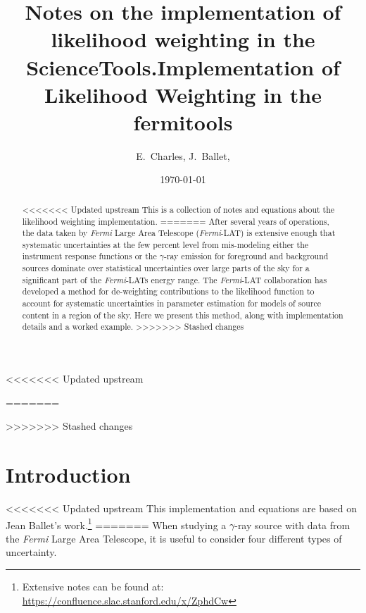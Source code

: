 \documentclass[preprint]{aastex}
\begin{document}
%
<<<<<<< Updated upstream
\title{Notes on the implementation of likelihood weighting in the ScienceTools.}  
=======
\title{Implementation of Likelihood Weighting in the fermitools}
>>>>>>> Stashed changes

\author{ 
E.~Charles, 
J.~Ballet, 
}

\date{\today}

\begin{abstract}
<<<<<<< Updated upstream
  This is a collection of notes and equations about the likelihood weighting implementation.
=======
  After several years of operations, the data taken by {\it Fermi} Large Area Telescope ({\it Fermi}-LAT) is extensive
  enough that systematic uncertainties at the few percent level from mis-modeling either the instrument response functions
  or the $\gamma$-ray emission for foreground and background sources dominate over statistical uncertainties
  over large parts of the sky for a significant part of the {\it Fermi}-LATs energy range.   The {\it Fermi}-LAT
  collaboration has developed a method for de-weighting contributions to the likelihood function 
  to account for systematic uncertainties in parameter estimation for models of source content in
  a region of the sky.
  Here we present this method, along with implementation details and a worked example.
>>>>>>> Stashed changes
\end{abstract}

\maketitle

\section{Introduction}

<<<<<<< Updated upstream
This implementation and equations are based on Jean Ballet's work.\footnote{Extensive notes can be found at: \url{https://confluence.slac.stanford.edu/x/ZphdCw}}
=======
When studying a $\gamma$-ray source with data from the {\it Fermi} Large Area Telescope, 
it is useful to consider four different types of uncertainty.  
\end{document}
